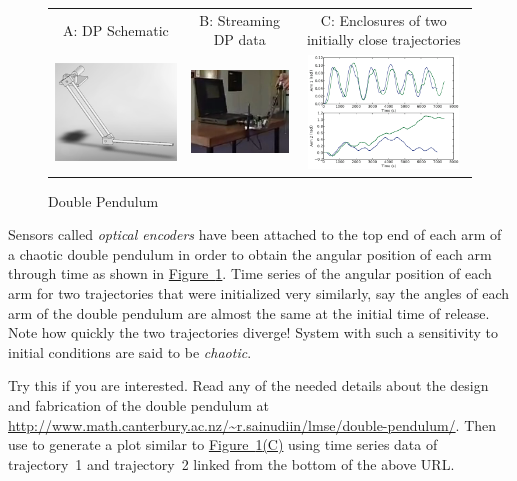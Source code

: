 \begin{figure}[htbp]
\begin{center}
{\scriptsize
\begin{tabular}{ccc}
A: DP Schematic & B: Streaming DP data & C: Enclosures of two initially close trajectories\\
  \includegraphics[scale=0.5]{figures/dp} &
  \includegraphics[scale=0.66]{figures/vlcsnap-2010-01-13-10h11m08s38_closeup} &
  \includegraphics[height=3cm,width=6.75cm]{figures/divergence_piers}
\end{tabular}
}
\end{center}
\caption{Double Pendulum}
\label{F:DP3}
\end{figure}

Sensors called {\em optical encoders} have been attached to the top end of each arm of a chaotic double pendulum in order to obtain the angular position of each arm through time as shown in \hyperref[F:DP3]{Figure~\ref*{F:DP3}}.  Time series of the angular position of each arm for two trajectories that were initialized very similarly, say the angles of each arm of the double pendulum are almost the same at the initial time of release.  Note how quickly the two trajectories diverge!  System with such a sensitivity to initial conditions are said to be {\em chaotic}.

\begin{labwork}\label{LW:DPtrajectoryparsing}  Try this if you are interested.  Read any of the needed details about the design and fabrication of  the double pendulum at \href{http://www.math.canterbury.ac.nz/~r.sainudiin/lmse/double-pendulum/}{\url{http://www.math.canterbury.ac.nz/~r.sainudiin/lmse/double-pendulum/}}.  Then use \Matlab to generate a plot similar to \hyperref[F:DP3]{Figure~\ref*{F:DP3}(C)} using time series data of {\sf trajectory~1} and {\sf  trajectory~2} linked from the bottom of the above URL.
 \end{labwork}

